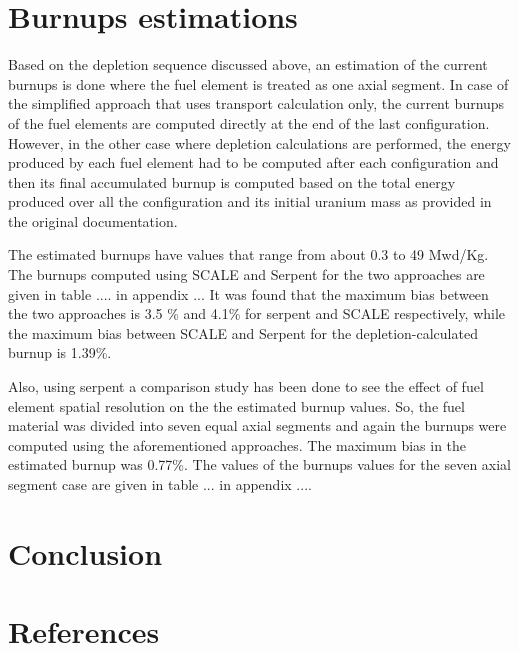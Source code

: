 \documentclass[review]{elsarticle}
\begin{document}
\section{Burnups estimations}
 Based on the depletion sequence discussed above, an estimation of the current burnups is done where the fuel element is treated as one axial segment.
 In case of the simplified approach that uses transport calculation only, the current burnups of the fuel elements are computed directly at the end of the last configuration.
  However, in the other case where depletion calculations are performed, the energy produced by each fuel element had to be computed after each configuration and then its final accumulated burnup is computed based on the total energy produced over all the configuration and its initial uranium mass as provided in the original documentation.
  
  The estimated burnups have values that range from about 0.3 to 49 Mwd/Kg. The burnups computed using SCALE and Serpent for the two approaches are given in table .... in appendix ...
  It was found that the maximum bias between the two approaches is 3.5 \% and 4.1\% for serpent and SCALE respectively, while the maximum bias between SCALE and Serpent for the depletion-calculated burnup is 1.39\%.
  
  Also, using serpent a comparison study has been done to see the effect of fuel element spatial resolution on the the estimated burnup values. So, the fuel material was divided into seven equal axial segments and again the burnups were computed using the aforementioned approaches. 
  The maximum bias in the estimated burnup was 0.77\%. The values of the burnups values for the seven axial segment case are given in table ... in appendix ....
  
 
\section{Conclusion}

\section*{References}


\end{document}
